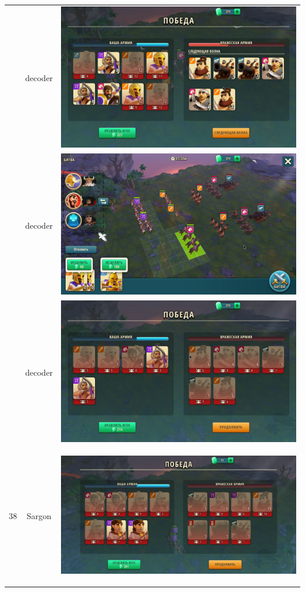 \begin{longtable}{|c|c|c|}
	& decoder &
	\includegraphics[width=0.75\linewidth]{./parts/media/TreasureHunt/37/decoder/photo_2022-04-14_12-36-38.jpg} \\
	& decoder &
	\includegraphics[width=0.75\linewidth]{./parts/media/TreasureHunt/37/decoder/photo_2022-04-14_12-36-42.jpg} \\
	& decoder &
	\includegraphics[width=0.75\linewidth]{./parts/media/TreasureHunt/37/decoder/photo_2022-04-14_12-36-46.jpg} \\
	\hline
	\multirow{8}{*}{38} & Sargon &
	\hypertarget{fight38}{\includegraphics[width=0.75\linewidth]{./parts/media/TreasureHunt/38/sargon/photo_2022-04-07_13-17-35.jpg}} \\

\end{longtable}
